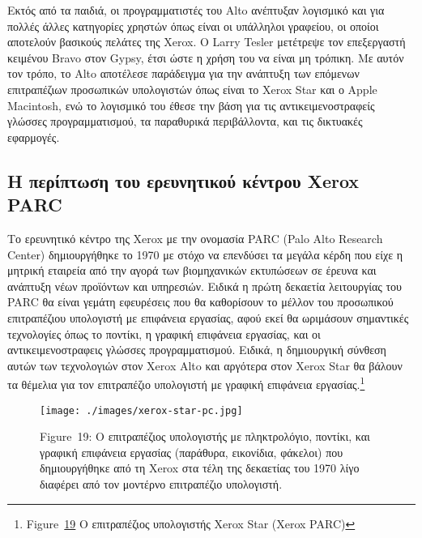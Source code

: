 \documentclass[
]{article}
\begin{document}
Εκτός από τα παιδιά, οι προγραμματιστές του Alto ανέπτυξαν λογισμικό και
για πολλές άλλες κατηγορίες χρηστών όπως είναι οι υπάλληλοι γραφείου, οι
οποίοι αποτελούν βασικούς πελάτες της Xerox. Ο Larry Tesler μετέτρεψε
τον επεξεργαστή κειμένου Bravo στον Gypsy, έτσι ώστε η χρήση του να
είναι μη τρόπικη. Με αυτόν τον τρόπο, το Alto αποτέλεσε παράδειγμα για
την ανάπτυξη των επόμενων επιτραπέζιων προσωπικών υπολογιστών όπως είναι
το Xerox Star και ο Apple Macintosh, ενώ το λογισμικό του έθεσε την βάση
για τις αντικειμενοστραφείς γλώσσες προγραμματισμού, τα παραθυρικά
περιβάλλοντα, και τις δικτυακές εφαρμογές.

\hypertarget{ux3b7-ux3c0ux3b5ux3c1ux3afux3c0ux3c4ux3c9ux3c3ux3b7-ux3c4ux3bfux3c5-ux3b5ux3c1ux3b5ux3c5ux3bdux3b7ux3c4ux3b9ux3baux3bfux3cd-ux3baux3adux3bdux3c4ux3c1ux3bfux3c5-xerox-parc}{%
\subsection{Η περίπτωση του ερευνητικού κέντρου Xerox
PARC}\label{ux3b7-ux3c0ux3b5ux3c1ux3afux3c0ux3c4ux3c9ux3c3ux3b7-ux3c4ux3bfux3c5-ux3b5ux3c1ux3b5ux3c5ux3bdux3b7ux3c4ux3b9ux3baux3bfux3cd-ux3baux3adux3bdux3c4ux3c1ux3bfux3c5-xerox-parc}}

Το ερευνητικό κέντρο της Xerox με την ονομασία PARC (Palo Alto Research
Center) δημιουργήθηκε το 1970 με στόχο να επενδύσει τα μεγάλα κέρδη που
είχε η μητρική εταιρεία από την αγορά των βιομηχανικών εκτυπώσεων σε
έρευνα και ανάπτυξη νέων προϊόντων και υπηρεσιών. Ειδικά η πρώτη
δεκαετία λειτουργίας του PARC θα είναι γεμάτη εφευρέσεις που θα
καθορίσουν το μέλλον του προσωπικού επιτραπέζιου υπολογιστή με επιφάνεια
εργασίας, αφού εκεί θα ωριμάσουν σημαντικές τεχνολογίες όπως το ποντίκι,
η γραφική επιφάνεια εργασίας, και οι αντικειμενοστραφεις γλώσσες
προγραμματισμού. Ειδικά, η δημιουργική σύνθεση αυτών των τεχνολογιών
στον Xerox Alto και αργότερα στον Xerox Star θα βάλουν τα θέμελια για
τον επιτραπέζιο υπολογιστή με γραφική επιφάνεια εργασίας.\footnote{Figure~\protect\hyperlink{fig:xerox-star-pc}{19}
  Ο επιτραπέζιος υπολογιστής Xerox Star (Xerox PARC)}

\leavevmode{}%
\begin{figure}
\hypertarget{fig:xerox-star-pc}{%
\centering
\texttt{[image: ./images/xerox-star-pc.jpg]}
\caption{Figure~19: Ο επιτραπέζιος υπολογιστής με πληκτρολόγιο, ποντίκι,
και γραφική επιφάνεια εργασίας (παράθυρα, εικονίδια, φάκελοι) που
δημιουργήθηκε από τη Xerox στα τέλη της δεκαετίας του 1970 λίγο διαφέρει
από τον μοντέρνο επιτραπέζιο υπολογιστή.}\label{fig:xerox-star-pc}
}
\end{figure}
\end{document}
